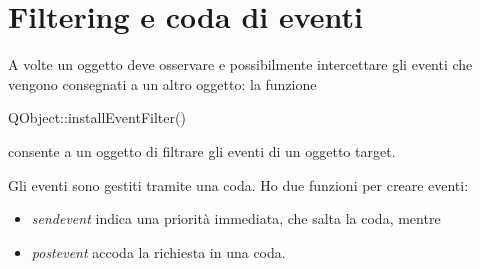 \section{Filtering e coda di eventi}
A volte un oggetto deve osservare e possibilmente intercettare gli
eventi che vengono consegnati a un altro oggetto: la funzione

\begin{tcolorbox}
QObject::installEventFilter() 
\end{tcolorbox}

consente a un oggetto di filtrare gli eventi di un oggetto target.

Gli eventi sono gestiti tramite una coda. Ho due funzioni per creare eventi:\\

\begin{itemize}
\item \textit{sendevent} indica una priorità immediata, che salta la coda, mentre
\item \textit{postevent} accoda la richiesta in una coda.
\end{itemize}



